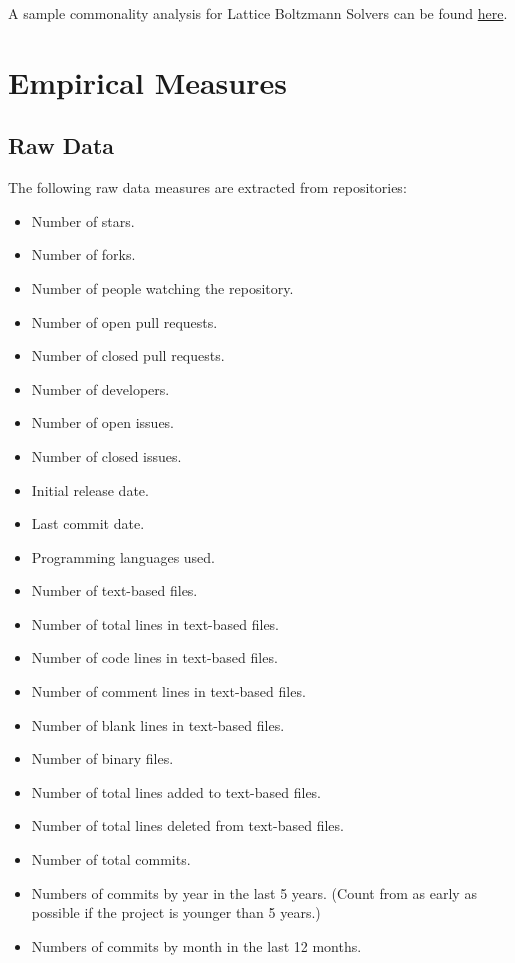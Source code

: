 \documentclass[letterpaper,cleveref]{lipics-v2019}
\theoremstyle{definition}
\begin{document}
A sample commonality analysis for Lattice Boltzmann Solvers can be found
\href{run:../Peter-Notes/Commonality-Analysis-LB-Systems.pdf}{here}.

\section{Empirical Measures} \label{SecEmpiricalMeasures}

\subsection{Raw Data}
The following raw data measures are extracted from repositories:

\begin{itemize}
\item Number of stars.
\item Number of forks.
\item Number of people watching the repository.
\item Number of open pull requests.
\item Number of closed pull requests.	
\item Number of developers.	
\item Number of open issues.
\item Number of closed issues.
\item Initial release date.
\item Last commit date.
\item Programming languages used.
\item Number of text-based files.
\item Number of total lines in text-based files.
\item Number of code lines in text-based files.
\item Number of comment lines in text-based files.
\item Number of blank lines in text-based files.
\item Number of binary files.  
\item Number of total lines added to text-based files.
\item Number of total lines deleted from text-based files.
\item Number of total commits.
\item Numbers of commits by year in the last 5 years. (Count from as early as possible if the project is younger than 5 years.) 
\item Numbers of commits by month in the last 12 months.
\end{itemize}
\end{document}
